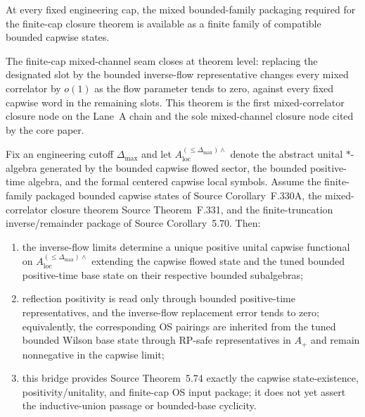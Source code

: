 \begin{corollary}
At every fixed engineering cap, the mixed bounded-family packaging required for the finite-cap closure theorem is available as a finite family of compatible bounded capwise states.
\end{corollary}

\begin{theorem}
The finite-cap mixed-channel seam closes at theorem level: replacing the designated slot by the bounded inverse-flow representative changes every mixed correlator by $o(1)$ as the flow parameter tends to zero, against every fixed capwise word in the remaining slots. This theorem is the first mixed-correlator closure node on the Lane~A chain and the sole mixed-channel closure node cited by the core paper.
\end{theorem}

\begin{thmLaneABridge}\label{thm:LaneA_closure_bridge}
Fix an engineering cutoff $\Delta_{\max}$ and let $A_{\mathrm{loc}}^{(\le \Delta_{\max})\wedge}$ denote the abstract unital $\ast$-algebra generated by the bounded capwise flowed sector, the bounded positive-time algebra, and the formal centered capwise local symbols. Assume the finite-family packaged bounded capwise states of Source Corollary~F.330A, the mixed-correlator closure theorem Source Theorem~F.331, and the finite-truncation inverse/remainder package of Source Corollary~5.70. Then:
\begin{enumerate}[label=(\roman*),leftmargin=2.2em]
\item the inverse-flow limits determine a unique positive unital capwise functional on $A_{\mathrm{loc}}^{(\le \Delta_{\max})\wedge}$ extending the capwise flowed state and the tuned bounded positive-time base state on their respective bounded subalgebras;
\item reflection positivity is read only through bounded positive-time representatives, and the inverse-flow replacement error tends to zero; equivalently, the corresponding OS pairings are inherited from the tuned bounded Wilson base state through RP-safe representatives in $A_+$ and remain nonnegative in the capwise limit;
\item this bridge provides Source Theorem~5.74 exactly the capwise state-existence, positivity/unitality, and finite-cap OS input package; it does not yet assert the inductive-union passage or bounded-base cyclicity.
\end{enumerate}
\end{thmLaneABridge}

